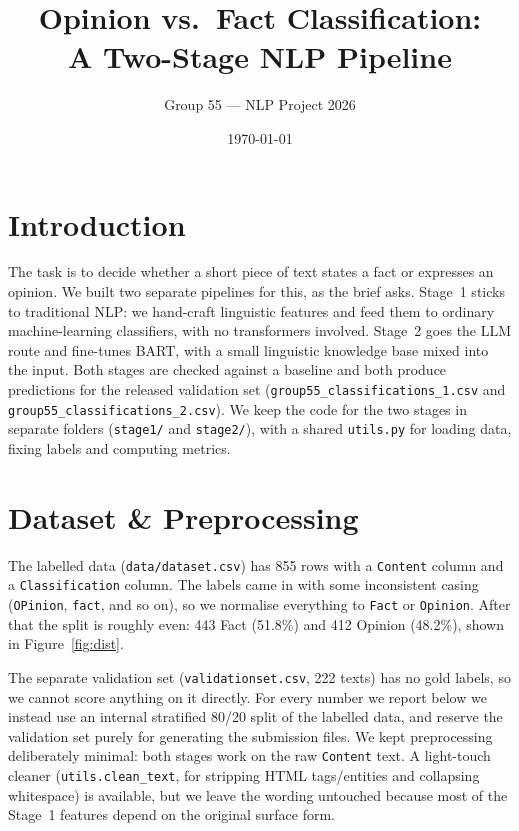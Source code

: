 \documentclass[10pt,a4paper]{article}
\title{\vspace{-1.4cm}\textbf{Opinion vs.\ Fact Classification:\\
A Two-Stage NLP Pipeline}}
\author{Group 55 --- NLP Project 2026}
\date{\today}
\begin{document}
\maketitle
\vspace{-0.6cm}

\section{Introduction}
The task is to decide whether a short piece of text states a fact or expresses
an opinion. We built two separate pipelines for this, as the brief asks. Stage~1
sticks to traditional NLP: we hand-craft linguistic features and feed them to
ordinary machine-learning classifiers, with no transformers involved. Stage~2
goes the LLM route and fine-tunes BART, with a small linguistic knowledge base
mixed into the input. Both stages are checked against a baseline and both
produce predictions for the released validation set
(\texttt{group55\_classifications\_1.csv} and
\texttt{group55\_classifications\_2.csv}). We keep the code for the two stages in
separate folders (\texttt{stage1/} and \texttt{stage2/}), with a shared
\texttt{utils.py} for loading data, fixing labels and computing metrics.

\section{Dataset \& Preprocessing}
The labelled data (\texttt{data/dataset.csv}) has 855 rows with a
\texttt{Content} column and a \texttt{Classification} column. The labels came in
with some inconsistent casing (\texttt{OPinion}, \texttt{fact}, and so on), so we
normalise everything to \texttt{Fact} or \texttt{Opinion}. After that the split
is roughly even: 443 Fact (51.8\%) and 412 Opinion (48.2\%), shown in
Figure~\ref{fig:dist}.

The separate validation set (\texttt{validationset.csv}, 222 texts) has no gold
labels, so we cannot score anything on it directly. For every number we report
below we instead use an internal stratified 80/20 split of the labelled data,
and reserve the validation set purely for generating the submission files. We
kept preprocessing deliberately minimal: both stages work on the raw
\texttt{Content} text. A light-touch cleaner (\texttt{utils.clean\_text}, for
stripping HTML tags/entities and collapsing whitespace) is available, but we
leave the wording untouched because most of the Stage~1 features depend on the
original surface form.
\end{document}

